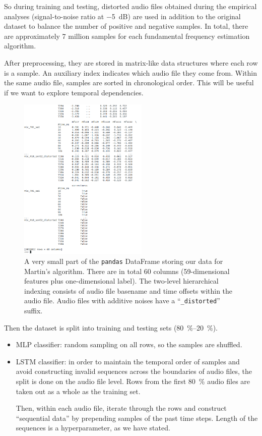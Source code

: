 \documentclass[11pt,a4paper]{report}
\begin{document}
So during training and testing, distorted audio files obtained during the empirical analyses (signal-to-noise ratio at \SI{-5}{\deci\bel}) are used in addition to the original dataset to balance the number of positive and negative samples.
In total, there are approximately 7 million samples for each fundamental frequency estimation algorithm.

\bigskip

After preprocessing, they are stored in matrix-like data structures where each row is a sample.
An auxiliary index indicates which audio file they come from.
Within the same audio file, samples are sorted in chronological order.
This will be useful if we want to explore temporal dependencies.

\begin{figure}[htbp]
  \centering
  \includegraphics[width=0.55\textwidth]{df.png}
  \caption[Data storage scheme.]{A very small part of the \texttt{pandas} DataFrame storing our data for Martin's algorithm.
    There are in total 60 columns (59-dimensional features plus one-dimensional label).
    The two-level hierarchical indexing consists of audio file basename and time offsets within the audio file.
    Audio files with additive noises have a \enquote{\texttt{\_distorted}} suffix.}
  \label{fig:df}
\end{figure}

Then the dataset is split into training and testing sets (\SIrange[range-phrase=/]{80}{20}{\percent}).

\begin{itemize}
  \item MLP classifier: random sampling on all rows, so the samples are shuffled.
  \item LSTM classifier: in order to maintain the temporal order of samples and avoid constructing invalid sequences across the boundaries of audio files, the split is done on the audio file level.
    Rows from the first \SI{80}{\percent} audio files are taken out as a whole as the training set.

    Then, within each audio file, iterate through the rows and construct \enquote{sequential data} by prepending samples of the past time steps.
    Length of the sequences is a hyperparameter, as we have stated.
\end{itemize}
\end{document}
